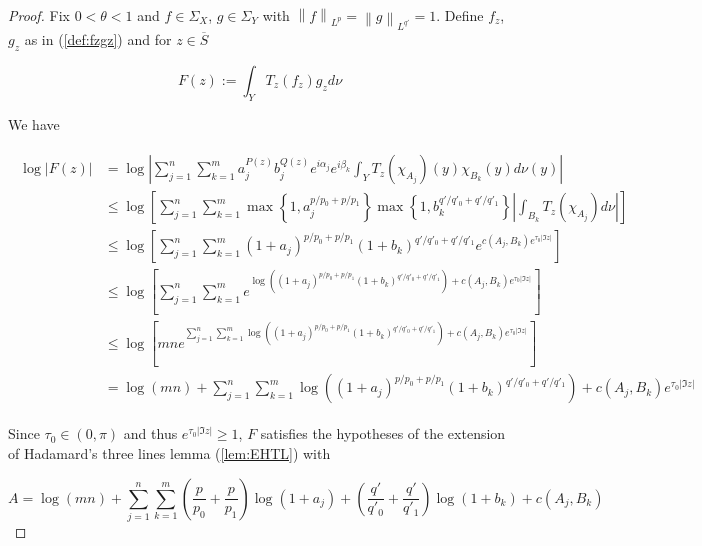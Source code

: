 \begin{proof}
	Fix $0 < \theta < 1$ and $f \in \Sigma_X$, $g \in \Sigma_Y$ with $\left\|f\right\|_{L^p} = \left\|g\right\|_{L^{q'}} = 1$. Define $f_z$, $g_z$ as in (\ref{def:fzgz}) and for $z \in \overline{S}$

	\begin{equation}
		F(z) := \int_Y T_z(f_z)g_z d\nu	
	\end{equation}

	We have

	\begin{gather*}
		\begin{aligned}
			\log \left| F(z) \right| &= \log \left| \sum_{j = 1}^n\sum_{k = 1}^m a^{P(z)}_j b_j^{Q(z)} e^{i\alpha_j} e^{i\beta_k} \int_YT_z(\chi_{A_j})(y)\chi_{B_k}(y)d\nu(y)\right|\\
			&\leq  \log \left[ \sum_{j = 1}^n\sum_{k = 1}^m \max\left\{1,a_j^{p/p_0 + p/p_1}\right\} \max\left\{1,b_k^{q'/q'_0 + q'/q'_1}\right\} \left|\int_{B_k} T_z(\chi_{A_j}) d\nu\right|\right]\\
		&\leq \log\left[ \sum_{j = 1}^n\sum_{k = 1}^m \left( 1 + a_j\right)^{p/p_0 + p/p_1} \left(1 + b_k\right)^{q'/q'_0 + q'/q'_1} e^{c(A_j,B_k)e^{\tau_0 \left| \Im z\right|}} \right]\\
	&\leq  \log\left[ \sum_{j = 1}^n\sum_{k = 1}^m e^{\log\left(\left( 1 + a_j\right)^{p/p_0 + p/p_1}\left( 1 + b_k\right)^{q'/q'_0 + q'/q'_1}\right) + c(A_j,B_k)e^{\tau_0 \left| \Im z\right|}} \right]\\
	&\leq \log\left[ mn e^{\sum_{j = 1}^n\sum_{k = 1}^m\log\left(\left( 1 + a_j\right)^{p/p_0 + p/p_1} \left(1 + b_k\right)^{q'/q'_0 + q'/q'_1}\right) + c(A_j,B_k)e^{\tau_0 \left| \Im z\right|}} \right]\\
			&= \log\left( mn \right) + \sum_{j = 1}^n\sum_{k = 1}^m\log\left(\left(1 + a_j\right)^{p/p_0 + p/p_1}\left(1 +  b_k\right)^{q'/q'_0 + q'/q'_1}\right) + c(A_j,B_k)e^{\tau_0 \left| \Im z\right|}
		\end{aligned}
	\end{gather*}

	Since $\tau_0 \in (0,\pi)$ and thus $e^{\tau_0 \left| \Im z\right|} \geq 1$, $F$ satisfies the hypotheses of the extension of Hadamard's three lines lemma (\ref{lem:EHTL}) with 

		\begin{equation*}
		A =  \log\left( mn \right) + \sum_{j = 1}^n\sum_{k = 1}^m\left( \frac{p}{p_0} + \frac{p}{p_1}\right)\log\left(1 + a_j\right) + \left( \frac{q'}{q'_0} + \frac{q'}{q'_1} \right) \log\left( 1 + b_k\right) + c(A_j,B_k)
	\end{equation*}


\end{proof}
